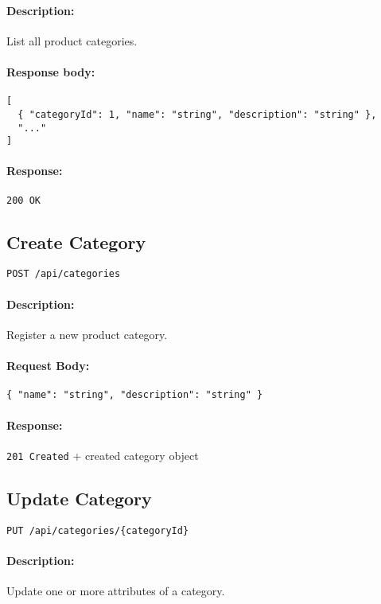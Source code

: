 \documentclass[a4paper,11pt]{article}
\begin{document}
\paragraph{Description:} List all product categories.
\paragraph{Response body:}
\begin{verbatim}
[
  { "categoryId": 1, "name": "string", "description": "string" },
  "..."
]
\end{verbatim}
\paragraph{Response:} \texttt{200 OK}

\subsection{Create Category}
\label{sec:categories-create}
\begin{verbatim}
POST /api/categories
\end{verbatim}
\paragraph{Description:} Register a new product category.
\paragraph{Request Body:}
\begin{verbatim}
{ "name": "string", "description": "string" }
\end{verbatim}
\paragraph{Response:} \texttt{201 Created} + created category object

\subsection{Update Category}
\label{sec:categories-update}
\begin{verbatim}
PUT /api/categories/{categoryId}
\end{verbatim}
\paragraph{Description:} Update one or more attributes of a category.
\end{document}
